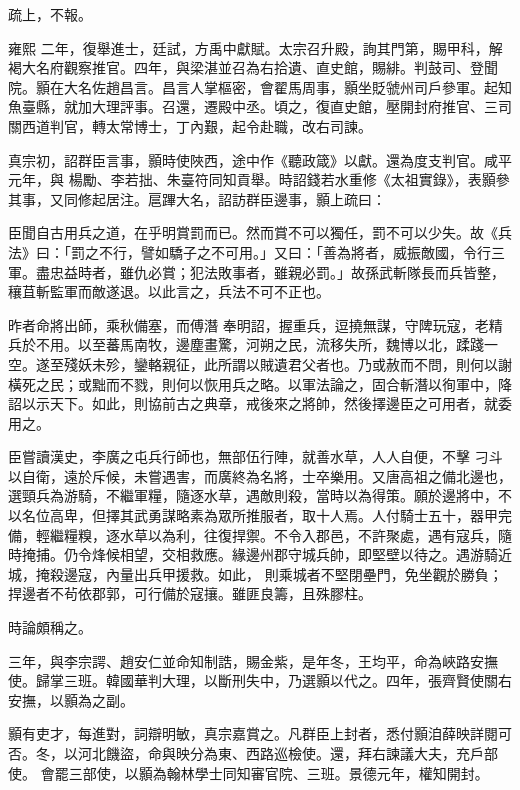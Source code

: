 \begin{pinyinscope}
 疏上，不報。



 雍熙
 二年，復舉進士，廷試，方禹中獻賦。太宗召升殿，詢其門第，賜甲科，解褐大名府觀察推官。四年，與梁湛並召為右拾遺、直史館，賜緋。判鼓司、登聞院。顥在大名佐趙昌言。昌言人掌樞密，會翟馬周事，顥坐貶虢州司戶參軍。起知魚臺縣，就加大理評事。召還，遷殿中丞。頃之，復直史館，壓開封府推官、三司關西道判官，轉太常博士，丁內艱，起令赴職，改右司諫。



 真宗初，詔群臣言事，顥時使陜西，途中作《聽政箴》以獻。還為度支判官。咸平元年，與
 楊勵、李若拙、朱臺符同知貢舉。時詔錢若水重修《太祖實錄》，表顥參其事，又同修起居注。扈蹕大名，詔訪群臣邊事，顥上疏曰：



 臣聞自古用兵之道，在乎明賞罰而已。然而賞不可以獨任，罰不可以少失。故《兵法》曰：「罰之不行，譬如驕子之不可用。」又曰：「善為將者，威振敵國，令行三軍。盡忠益時者，雖仇必賞；犯法敗事者，雖親必罰。」故孫武斬隊長而兵皆整，穰苴斬監軍而敵遂退。以此言之，兵法不可不正也。



 昨者命將出師，乘秋備塞，而傅潛
 奉明詔，握重兵，逗撓無謀，守陴玩寇，老精兵於不用。以至蕃馬南牧，邊塵畫驚，河朔之民，流移失所，魏博以北，蹂踐一空。遂至殘妖未殄，鑾輅親征，此所謂以賊遺君父者也。乃或赦而不問，則何以謝橫死之民；或黜而不戮，則何以恢用兵之略。以軍法論之，固合斬潛以徇軍中，降詔以示天下。如此，則協前古之典章，戒後來之將帥，然後擇邊臣之可用者，就委用之。



 臣嘗讀漢史，李廣之屯兵行師也，無部伍行陣，就善水草，人人自便，不擊
 刁斗以自衛，遠於斥候，未嘗遇害，而廣終為名將，士卒樂用。又唐高祖之備北邊也，選頸兵為游騎，不繼軍糧，隨逐水草，遇敵則殺，當時以為得策。願於邊將中，不以名位高卑，但擇其武勇謀略素為眾所推服者，取十人焉。人付騎士五十，器甲完備，輕繼糧糗，逐水草以為利，往復捍禦。不令入郡邑，不許聚處，遇有寇兵，隨時掩捕。仍令烽候相望，交相救應。緣邊州郡守城兵帥，即堅壁以待之。遇游騎近城，掩殺邊寇，內量出兵甲援救。如此，
 則乘城者不堅閉壘門，免坐觀於勝負；捍邊者不茍依郡郭，可行備於寇攘。雖匪良籌，且殊膠柱。



 時論頗稱之。



 三年，與李宗諤、趙安仁並命知制誥，賜金紫，是年冬，王均平，命為峽路安撫使。歸掌三班。韓國華判大理，以斷刑失中，乃選顥以代之。四年，張齊賢使關右安撫，以顥為之副。



 顥有吏才，每進對，詞辯明敏，真宗嘉賞之。凡群臣上封者，悉付顥洎薛映詳閱可否。冬，以河北饑盜，命與映分為東、西路巡檢使。還，拜右諫議大夫，充戶部使。
 會罷三部使，以顥為翰林學士同知審官院、三班。景德元年，權知開封。




\end{pinyinscope}
